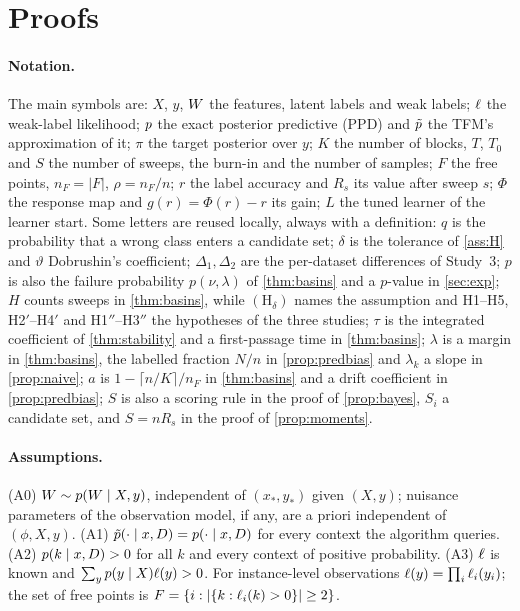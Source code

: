 \section{Proofs}\label{app:proofs}

\paragraph{Notation.} The main symbols are: $X$, $y$, $W$ the features, latent labels and weak labels; $\ell$ the
weak-label likelihood; $p$ the exact posterior predictive (PPD) and $\tilde p$ the TFM's approximation of it; $\pi$ the
target posterior over $y$; $K$ the number of blocks, $T$, $T_0$ and $S$ the number of sweeps, the burn-in and the number
of samples; $F$ the free points, $n_F=\lvert F\rvert$, $\rho=n_F/n$; $r$ the label accuracy and $R_s$ its value after
sweep $s$; $\Phi$ the response map and $g(r)=\Phi(r)-r$ its gain; $L$ the tuned learner of the learner start. Some
letters are reused locally, always with a definition: $q$ is the probability that a wrong class enters a candidate set;
$\delta$ is the tolerance of \cref{ass:H} and $\vartheta$ Dobrushin's coefficient; $\Delta_1,\Delta_2$ are the
per-dataset differences of Study~3; $p$ is also the failure probability $p(\nu,\lambda)$ of \cref{thm:basins} and a
$p$-value in \cref{sec:exp}; $H$ counts sweeps in \cref{thm:basins}, while $(\mathrm H_\delta)$ names the assumption
and H1--H5, H2$'$--H4$'$ and H1$''$--H3$''$ the hypotheses of the three studies; $\tau$ is the integrated coefficient of
\cref{thm:stability} and a first-passage time in \cref{thm:basins}; $\lambda$ is a margin in \cref{thm:basins}, the
labelled fraction $N/n$ in \cref{prop:predbias} and $\lambda_k$ a slope in \cref{prop:naive}; $a$ is $1-\lceil
n/K\rceil/n_F$ in \cref{thm:basins} and a drift coefficient in \cref{prop:predbias}; $S$ is also a scoring rule in the
proof of \cref{prop:bayes}, $S_i$ a candidate set, and $S=nR_s$ in the proof of \cref{prop:moments}.

\paragraph{Assumptions.} (A0) $W\sim p(W\mid X,y)$, independent of $(x_*,y_*)$ given $(X,y)$; nuisance parameters of
the observation model, if any, are a priori independent of $(\phi,X,y)$. (A1) $\tilde p(\cdot\mid x,D)=p(\cdot\mid x,D)$ for
every context the algorithm queries. (A2) $p(k\mid x,D)>0$ for all $k$ and every context of positive probability.
(A3) $\ell$ is known and $\sum_y p(y\mid X)\ell(y)>0$. For instance-level observations
$\ell(y)=\prod_i\ell_i(y_i)$; the set of free points is $F=\{i:\lvert\{k:\ell_i(k)>0\}\rvert\ge2\}$.

